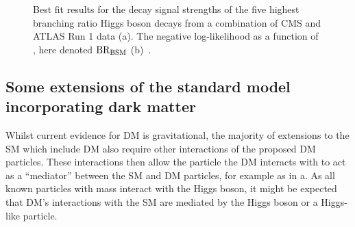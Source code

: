 \begin{figure}
  \caption{Best fit results for the decay signal strengths of the five highest branching ratio Higgs boson decays from a combination of CMS and ATLAS Run 1 data (a). The negative log-likelihood as a function of \BRinv, here denoted $\rm{BR_{BSM}}$ (b)~\cite{CMS-PAS-HIG-15-002}.}
  \label{fig:smdecaymeasurement}
\end{figure}

\subsection{Some extensions of the standard model incorporating dark matter}
\label{sec:DMextensions}
Whilst current evidence for \ac{DM} is gravitational, the majority of extensions to the \ac{SM} which include \ac{DM} also require other interactions of the proposed \ac{DM} particles. These interactions then allow the particle the \ac{DM} interacts with to act as a ``mediator'' between the \ac{SM} and \ac{DM} particles, for example as in a. As all known particles with mass interact with the Higgs boson, it might be expected that \ac{DM}'s interactions with the \ac{SM} are mediated by the Higgs boson or a Higgs-like particle.

